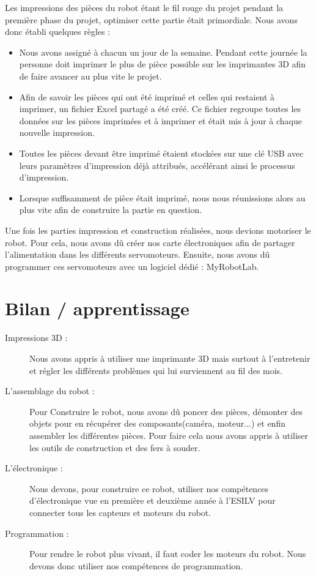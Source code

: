 \documentclass[11pt, oneside]{article}
\begin{document}
Les impressions des pièces du robot étant le fil rouge du projet pendant la première phase du projet, optimiser cette partie était primordiale. Nous avons donc établi quelques règles :
	\begin{itemize}
	\item Nous avons assigné à chacun un jour de la semaine. Pendant cette journée la personne doit imprimer le plus de pièce possible sur les imprimantes 3D afin de faire avancer au plus vite le projet.
	\item Afin de savoir les pièces qui ont été imprimé et celles qui restaient à imprimer, un fichier Excel partagé a été créé. Ce fichier regroupe toutes les données sur les pièces imprimées et à imprimer et était mis à jour à chaque nouvelle impression.
	\item Toutes les pièces devant être imprimé étaient stockées sur une clé USB avec leurs paramètres d'impression déjà attribués, accélérant ainsi le processus d'impression.
	\item Lorsque suffisamment de pièce était imprimé, nous nous réunissions alors au plus vite afin de construire la partie en question.
	\end{itemize}

Une fois les parties impression et construction réalisées, nous devions motoriser le robot. Pour cela, nous avons dû créer nos carte électroniques afin de partager l'alimentation dans les différents servomoteurs. Ensuite, nous avons dû programmer ces servomoteurs avec un logiciel dédié : MyRobotLab.

\vspace{1cm}
\section{Bilan  / apprentissage}
\vspace{0.5cm}
\begin{description}
\item[Impressions 3D :] Nous avons appris à utiliser une imprimante 3D mais surtout à l'entretenir et régler les différents problèmes qui lui surviennent au fil des mois.
\item[L'assemblage du robot :] Pour Construire le robot, nous avons dû poncer des pièces, démonter des objets pour en récupérer des composants(caméra, moteur...) et enfin assembler les différentes pièces. Pour faire cela nous avons appris à utiliser les outils de construction et des fers à souder.
\item[L'électronique :] Nous devons, pour construire ce robot, utiliser nos compétences d'électronique vue en première et deuxième année à l'ESILV pour connecter tous les capteurs et moteurs du robot.
\item[Programmation :] Pour rendre le robot plus vivant, il faut coder les moteurs du robot. Nous devons donc utiliser nos compétences de programmation.
\end{description}
\end{document}
